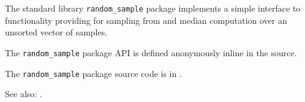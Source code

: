 
The standard library {\tt random\_sample} package implements a simple interface to 
functionality providing for sampling from and median computation over an unsorted 
vector of samples.

The {\tt random\_sample} package API is defined anonymously inline in the source.

The {\tt random\_sample} package source code is in .

See also:  .




